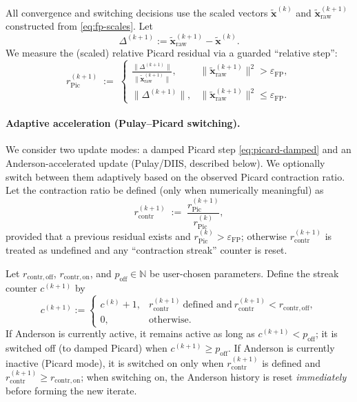 All convergence and switching decisions use the scaled vectors $\widetilde{\mathbf{x}}^{(k)}$ and $\widetilde{\mathbf{x}}_{\mathrm{raw}}^{(k+1)}$ constructed from \eqref{eq:fp-scales}. Let
\[
\Delta^{(k+1)} := \widetilde{\mathbf{x}}_{\mathrm{raw}}^{(k+1)}-\widetilde{\mathbf{x}}^{(k)}.
\]
We measure the (scaled) relative Picard residual via a guarded ``relative step'':
\begin{equation}\label{eq:fp-picard-res}
r_{\mathrm{Pic}}^{(k+1)} \;:=\;
\begin{cases}
\displaystyle \frac{\|\Delta^{(k+1)}\|}{\|\widetilde{\mathbf{x}}_{\mathrm{raw}}^{(k+1)}\|}, & \|\widetilde{\mathbf{x}}_{\mathrm{raw}}^{(k+1)}\|^2>\varepsilon_{\mathrm{FP}},\\[1.2ex]
\displaystyle \|\Delta^{(k+1)}\|, & \|\widetilde{\mathbf{x}}_{\mathrm{raw}}^{(k+1)}\|^2\le \varepsilon_{\mathrm{FP}}.
\end{cases}
\end{equation}

\paragraph{Adaptive acceleration (Pulay--Picard switching).}
We consider two update modes: a damped Picard step \eqref{eq:picard-damped} and an Anderson-accelerated update (Pulay/DIIS, described below). We optionally switch between them adaptively based on the observed Picard contraction ratio.
Let the contraction ratio be defined (only when numerically meaningful) as
\begin{equation}\label{eq:fp-contraction}
r_{\mathrm{contr}}^{(k+1)} \;:=\; \frac{r_{\mathrm{Pic}}^{(k+1)}}{r_{\mathrm{Pic}}^{(k)}},
\end{equation}
provided that a previous residual exists and $r_{\mathrm{Pic}}^{(k)}>\varepsilon_{\mathrm{FP}}$; otherwise $r_{\mathrm{contr}}^{(k+1)}$ is treated as undefined and any ``contraction streak'' counter is reset.

Let $r_{\mathrm{contr,off}}$, $r_{\mathrm{contr,on}}$, and $p_{\mathrm{off}}\in\mathbb{N}$ be user-chosen parameters. Define the streak counter $c^{(k+1)}$ by
\[
c^{(k+1)} :=
\begin{cases}
c^{(k)}+1, & r_{\mathrm{contr}}^{(k+1)}\ \text{defined and}\ r_{\mathrm{contr}}^{(k+1)}<r_{\mathrm{contr,off}},\\
0, & \text{otherwise}.
\end{cases}
\]
If Anderson is currently active, it remains active as long as $c^{(k+1)}<p_{\mathrm{off}}$; it is switched off (to damped Picard) when $c^{(k+1)}\ge p_{\mathrm{off}}$.
If Anderson is currently inactive (Picard mode), it is switched on only when $r_{\mathrm{contr}}^{(k+1)}$ is defined and $r_{\mathrm{contr}}^{(k+1)}\ge r_{\mathrm{contr,on}}$; when switching on, the Anderson history is reset \emph{immediately} before forming the new iterate.

